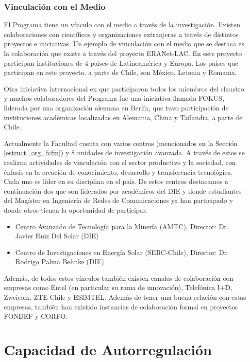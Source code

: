 \subsubsection{Vinculación con el Medio}
\label{vinculacion_medio}

El Programa tiene un vínculo con el medio a través de la investigación. Existen colaboraciones 
con científicos y organizaciones extranjeras a través de distintos proyectos e iniciativas. 
Un ejemplo de vinculación con el medio que se destaca es la colaboración 
que existe a través del proyecto ERANet-LAC. En este proyecto participan instituciones de 4 países de 
Latinoamérica y Europa. Los países que participan en este proyecto, a parte de Chile, son México,
Letonia y Romania.

Otra iniciativa internacional en que participaron todos los miembros del claustro y muchos colaboradores del Programa
fue una iniciativa llamada FOKUS, liderada por una organización alemana en Berlín, que tuvo participación de instituciones
académicas localizadas en Alemania, China y Tailandia, a parte de Chile.

Actualmente la Facultad cuenta con varios centros (mencionados en la Sección \ref{estruct_org_fcfm}) y 8 unidades de investigación
avanzada. A través de estos se realizan actividades de vinculación
con el sector productivo y la sociedad, con énfasis en la creación de conocimiento, desarrollo
y transferencia tecnológica. Cada uno es líder en su disciplina en el país. De estos centros
destacamos a continuación dos que son liderados por académicos del DIE y donde estudiantes del Magíster en Ingeniería de Redes de Comunicaciones ya han 
participado y donde otros tienen la oportunidad de participar.

\begin{itemize}
\item Centro Avanzado de Tecnología para la Minería (AMTC), Director: Dr. Javier Ruiz Del
Solar (DIE)
\item Centro de Investigaciones en Energía Solar (SERC-Chile), Director: Dr. Rodrigo Palma
Behnke (DIE)
\end{itemize}

Además, de todos estos vínculos también existen canales de colaboración con empresas como Entel
(en particular su rama de innovación), Telefónica I+D, 
Zweicom, ZTE Chile y ESIMTEL. Además de tener una buena relación con estas 
empresas, también han existido instancias de colaboración formal en proyectos FONDEF y CORFO.


\section{Capacidad de Autorregulación}

